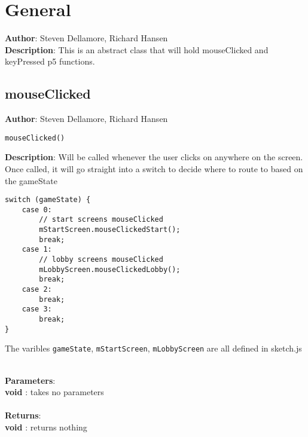 \documentclass[12pt]{article}
\begin{document}
\section{General}
\textbf{Author}: Steven Dellamore, Richard Hansen \\
\textbf{Description}: This is an abstract class that will hold mouseClicked and keyPressed p5 functions. \\



\subsection{mouseClicked}
\textbf{Author}: Steven Dellamore, Richard Hansen 
\vspace*{1\baselineskip}
\begin{lstlisting}
mouseClicked()
\end{lstlisting} 
\vspace*{1\baselineskip}
\textbf{Description}: Will be called whenever the user clicks on anywhere on the screen. Once called, it will go straight into a switch to decide where to route to based on the gameState 
\begin{verbatim}
switch (gameState) {
    case 0:
        // start screens mouseClicked
        mStartScreen.mouseClickedStart(); 
        break;
    case 1:
        // lobby screens mouseClicked
        mLobbyScreen.mouseClickedLobby();
        break;
    case 2:
        break;
    case 3:
        break;
}
\end{verbatim}
 The varibles \texttt{gameState}, \texttt{mStartScreen}, \texttt{mLobbyScreen} are all defined in sketch.js 


\textbf{\large{\\Parameters}}:\\
\textbf{void }: takes no parameters\\\textbf{\large{\\Returns}}:\\\textbf{void }: returns nothing
\end{document}
